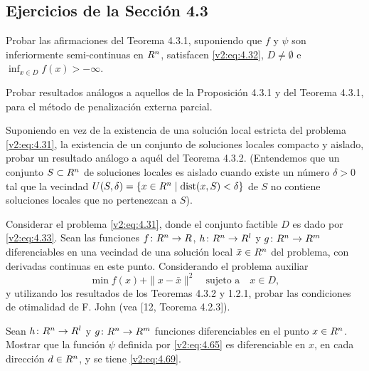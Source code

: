 \subsection*{Ejercicios de la Sección 4.3}

\begin{exercise}\label{v2:ejer:4.3.1}
    Probar las afirmaciones del Teorema 4.3.1, suponiendo que $f$ y $\psi$ son inferiormente semi-continuas en $R^n$, satisfacen \eqref{v2:eq:4.32}, $D \neq \emptyset$ e $\inf_{x \in D} f(x) > -\infty$.
\end{exercise}

\begin{exercise}\label{v2:ejer:4.3.2}
    Probar resultados análogos a aquellos de la Proposición 4.3.1 y del Teorema 4.3.1, para el método de penalización externa parcial.
\end{exercise}

\begin{exercise}\label{v2:ejer:4.3.3}
    Suponiendo en vez de la existencia de una solución local estricta del problema \eqref{v2:eq:4.31}, la existencia de un conjunto de soluciones locales compacto y aislado, probar un resultado análogo a aquél del Teorema 4.3.2. (Entendemos que un conjunto $S \subset R^n$ de soluciones locales es aislado cuando existe un número $\delta > 0$ tal que la vecindad $U(S, \delta) = \{x \in R^n \mid \operatorname{dist}(x, S) < \delta\}$ de $S$ no contiene soluciones locales que no pertenezcan a $S$).
\end{exercise}

\begin{exercise}\label{v2:ejer:4.3.4}
    Considerar el problema \eqref{v2:eq:4.31}, donde el conjunto factible $D$ es dado por \eqref{v2:eq:4.33}. Sean las funciones $f \colon R^n \to R$, $h \colon R^n \to R^l$ y $g \colon R^n \to R^m$ diferenciables en una vecindad de una solución local $\bar{x} \in R^n$ del problema, con derivadas continuas en este punto.
    Considerando el problema auxiliar
    \[
        \min f(x) + \|x - \bar{x}\|^2 \quad \text{sujeto a} \quad x \in D,
    \]
    y utilizando los resultados de los Teoremas 4.3.2 y 1.2.1, probar las condiciones de otimalidad de F. John (vea [12, Teorema 4.2.3]).
\end{exercise}

\begin{exercise}\label{v2:ejer:4.3.5}
    Sean $h \colon R^n \to R^l$ y $g \colon R^n \to R^m$ funciones diferenciables en el punto $x \in R^n$. Mostrar que la función $\psi$ definida por \eqref{v2:eq:4.65} es diferenciable en $x$, en cada dirección $d \in R^n$, y se tiene \eqref{v2:eq:4.69}.
\end{exercise}

